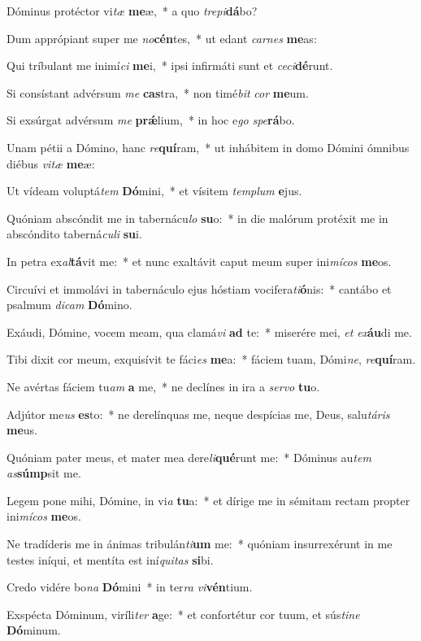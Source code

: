 \item Dóminus protéctor vi\textit{tæ} \textbf{me}æ,~* a quo \textit{tre}\textit{pi}\textbf{dá}bo?
\item Dum apprópiant super me \textit{no}\textbf{cén}tes,~* ut edant \textit{car}\textit{nes} \textbf{me}as:
\item Qui tríbulant me inimí\textit{ci} \textbf{me}i,~* ipsi infirmáti sunt et \textit{ce}\textit{ci}\textbf{dé}runt.
\item Si consístant advérsum \textit{me} \textbf{cas}tra,~* non timé\textit{bit} \textit{cor} \textbf{me}um.
\item Si exsúrgat advérsum \textit{me} \textbf{prǽ}lium,~* in hoc e\textit{go} \textit{spe}\textbf{rá}bo.
\item Unam pétii a Dómino, hanc \textit{re}\textbf{quí}ram,~* ut inhábitem in domo Dómini ómnibus diébus \textit{vi}\textit{tæ} \textbf{me}æ:
\item Ut vídeam voluptá\textit{tem} \textbf{Dó}mini,~* et vísitem \textit{tem}\textit{plum} \textbf{e}jus.
\item Quóniam abscóndit me in tabernácu\textit{lo} \textbf{su}o:~* in die malórum protéxit me in abscóndito taberná\textit{cu}\textit{li} \textbf{su}i.
\item In petra ex\textit{al}\textbf{tá}vit me:~* et nunc exaltávit caput meum super ini\textit{mí}\textit{cos} \textbf{me}os.
\item Circuívi et immolávi in tabernáculo ejus hóstiam vocifera\textit{ti}\textbf{ó}nis:~* cantábo et psalmum \textit{di}\textit{cam} \textbf{Dó}mino.
\item Exáudi, Dómine, vocem meam, qua clamá\textit{vi} \textbf{ad} te:~* miserére mei, \textit{et} \textit{ex}\textbf{áu}di me.
\item Tibi dixit cor meum, exquisívit te fáci\textit{es} \textbf{me}a:~* fáciem tuam, Dómi\textit{ne}, \textit{re}\textbf{quí}ram.
\item Ne avértas fáciem tu\textit{am} \textbf{a} me,~* ne declínes in ira a \textit{ser}\textit{vo} \textbf{tu}o.
\item Adjútor me\textit{us} \textbf{es}to:~* ne derelínquas me, neque despícias me, Deus, salu\textit{tá}\textit{ris} \textbf{me}us.
\item Quóniam pater meus, et mater mea dere\textit{li}\textbf{qué}runt me:~* Dóminus au\textit{tem} \textit{as}\textbf{súmp}sit me.
\item Legem pone mihi, Dómine, in vi\textit{a} \textbf{tu}a:~* et dírige me in sémitam rectam propter ini\textit{mí}\textit{cos} \textbf{me}os.
\item Ne tradíderis me in ánimas tribulán\textit{ti}\textbf{um} me:~* quóniam insurrexérunt in me testes iníqui, et mentíta est iní\textit{qui}\textit{tas} \textbf{si}bi.
\item Credo vidére bo\textit{na} \textbf{Dó}mini~* in ter\textit{ra} \textit{vi}\textbf{vén}tium.
\item Exspécta Dóminum, viríli\textit{ter} \textbf{a}ge:~* et confortétur cor tuum, et sús\textit{ti}\textit{ne} \textbf{Dó}minum.
